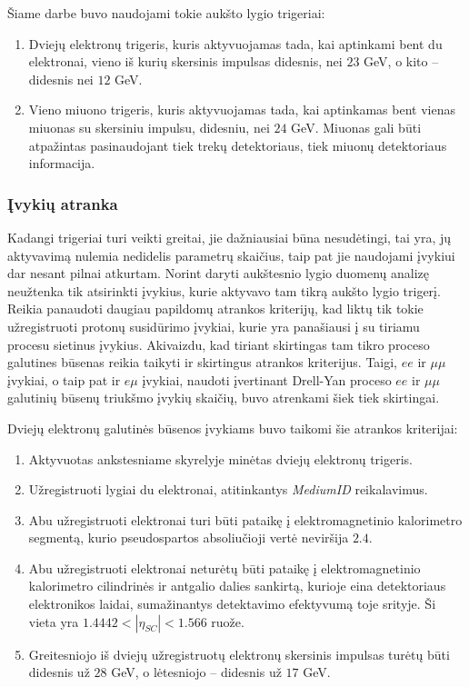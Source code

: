 \documentclass[a4paper, 12pt]{article}
\newcommand{\mumu}{\mu\mu}
\begin{document}
Šiame darbe buvo naudojami tokie aukšto lygio trigeriai:
\begin{enumerate}
\item Dviejų elektronų trigeris, kuris aktyvuojamas tada, kai aptinkami bent du elektronai, vieno iš kurių skersinis
impulsas didesnis, nei $23$ GeV, o kito -- didesnis nei $12$ GeV.
\item Vieno miuono trigeris, kuris aktyvuojamas tada, kai aptinkamas bent vienas miuonas su skersiniu impulsu,
didesniu, nei $24$ GeV. Miuonas gali būti atpažintas pasinaudojant tiek trekų detektoriaus, tiek miuonų
detektoriaus informacija.
\end{enumerate}


\subsubsection{Įvykių atranka}\label{sec:selection}

Kadangi trigeriai turi veikti greitai, jie dažniausiai būna nesudėtingi, tai yra, jų aktyvavimą nulemia
nedidelis parametrų skaičius, taip pat jie naudojami įvykiui dar nesant pilnai atkurtam.
Norint daryti aukštesnio lygio duomenų analizę neužtenka tik atsirinkti įvykius, kurie aktyvavo tam tikrą
aukšto lygio trigerį.
Reikia panaudoti daugiau papildomų atrankos kriterijų, kad liktų tik tokie užregistruoti protonų susidūrimo
įvykiai, kurie yra panašiausi į su tiriamu procesu sietinus įvykius.
Akivaizdu, kad tiriant skirtingas tam tikro proceso galutines būsenas reikia taikyti ir skirtingus atrankos
kriterijus.
Taigi, $ee$ ir $\mumu$ įvykiai, o taip pat ir $e\mu$ įvykiai, naudoti įvertinant Drell-Yan proceso $ee$ ir
$\mumu$ galutinių būsenų triukšmo įvykių skaičių, buvo atrenkami šiek tiek skirtingai.

Dviejų elektronų galutinės būsenos įvykiams buvo taikomi šie atrankos kriterijai:
\begin{enumerate}
	\item Aktyvuotas ankstesniame skyrelyje minėtas dviejų elektronų trigeris.
	\item Užregistruoti lygiai du elektronai, atitinkantys \textit{MediumID} reikalavimus.
	\item Abu užregistruoti elektronai turi būti pataikę į elektromagnetinio kalorimetro segmentą, kurio
	pseudospartos absoliučioji vertė neviršija $2.4$.
	\item Abu užregistruoti elektronai neturėtų būti pataikę į elektromagnetinio kalorimetro cilindrinės ir
	antgalio dalies sankirtą, kurioje eina detektoriaus elektronikos laidai, sumažinantys detektavimo efektyvumą
	toje srityje. Ši vieta yra $1.4442<|\eta_{SC}|<1.566$ ruože.
	\item Greitesniojo iš dviejų užregistruotų elektronų skersinis impulsas turėtų būti didesnis už $28$ GeV, o
	lėtesniojo -- didesnis už $17$ GeV.
\end{enumerate}
\end{document}
